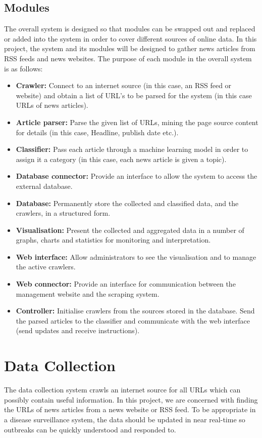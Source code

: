 \documentclass{l4proj}
\begin{document}
\subsection{Modules}
The overall system is designed so that modules can be swapped out and replaced or added into the system in order to cover different sources of online data. In this project, the system and its modules will be designed to gather news articles from RSS feeds and news websites. The purpose of each module in the overall system is as follows:
\begin{itemize}
    \item \textbf{Crawler: } Connect to an internet source (in this case, an RSS feed or website) and obtain a list of URL's to be parsed for the system (in this case URLs of news articles).
    \item \textbf{Article parser: } Parse the given list of URLs, mining the page source content for details (in this case, Headline, publish date etc.).
    \item \textbf{Classifier: } Pass each article through a machine learning model in order to assign it a category (in this case, each news article is given a topic).
    \item \textbf{Database connector: } Provide an interface to allow the system to access the external database.
    \item \textbf{Database: } Permanently store the collected and classified data, and the crawlers, in a structured form.
    \item \textbf{Visualisation: } Present the collected and aggregated data in a number of graphs, charts and statistics for monitoring and interpretation.
    \item \textbf{Web interface: } Allow administrators to see the visualisation and to manage the active crawlers.
    \item \textbf{Web connector: } Provide an interface for communication between the management website and the scraping system.
    \item \textbf{Controller: } Initialise crawlers from the sources stored in the database. Send the parsed articles to the classifier and communicate with the web interface (send updates and receive instructions).
\end{itemize}


\section{Data Collection}
The data collection system crawls an internet source for all URLs which can possibly contain useful information. In this project, we are concerned with finding the URLs of news articles from a news website or RSS feed. To be appropriate in a disease surveillance system, the data should be updated in near real-time so outbreaks can be quickly understood and responded to.
\end{document}
